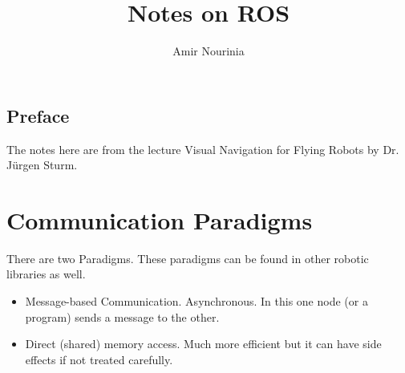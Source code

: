 \documentclass[]{report}
\title{Notes on ROS}
\author{Amir Nourinia}
\begin{document}
\maketitle

\section*{Preface}
The notes here are from the lecture Visual Navigation for Flying Robots by Dr. Jürgen Sturm. 
\chapter{Communication Paradigms}
    There are two Paradigms. These paradigms can be found in other robotic libraries as well.
    \begin{itemize}
        \item Message-based Communication. Asynchronous. In this one node (or a program) sends a message to the other.
        \item Direct (shared) memory access. Much more efficient but it can have side effects if not treated carefully.
    \end{itemize}
\end{document}
